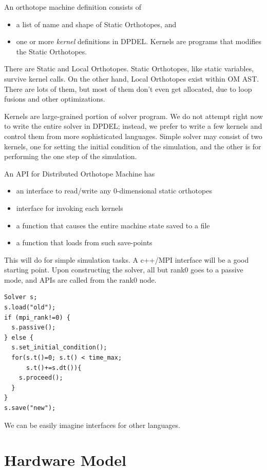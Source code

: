 \documentclass[twocolumn]{article}
\begin{document}
An orthotope machine definition consists of
\begin{itemize}
  \item a list of name and shape of Static Orthotopes, and
  \item one or more {\em kernel} definitions in DPDEL. Kernels are programs
    that modifies the Static Orthotopes.
\end{itemize}

There are Static and Local Orthotopes. Static Orthotopes, like static
variables, survive kernel calls. On the other hand, Local Orthotopes exist
within OM AST. There are lots of them, but most of them don't even get
allocated, due to loop fusions and other optimizations.

Kernels are large-grained portion of solver program. We do not attempt right
now to write the entire solver in DPDEL; instead, we prefer to write a few
kernels and control them from more sophisticated languages. Simple solver may
consist of two kernels, one for setting the initial condition of the
simulation, and the other is for performing the one step of the simulation.

An API for Distributed Orthotope Machine has
\begin{itemize}
  \item an interface to read/write any 0-dimensional static orthotopes
  \item interface for invoking each kernels
  \item a function that causes the entire machine state saved to a file
  \item a function that loads from such save-points
\end{itemize}

This will do for simple simulation tasks. A c++/MPI interface will be a good
starting point. Upon constructing the solver, all but rank0 goes to a passive
mode, and APIs are called from the rank0 node.

\begin{verbatim}
Solver s;
s.load("old");
if (mpi_rank!=0) {
  s.passive();
} else {
  s.set_initial_condition();
  for(s.t()=0; s.t() < time_max;
      s.t()+=s.dt()){
    s.proceed();
  }
}
s.save("new");
\end{verbatim}

We can be easily imagine interfaces for other languages.

\section{Hardware Model}
\end{document}
